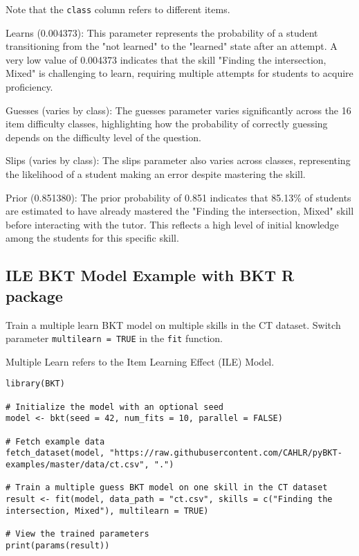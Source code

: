 \documentclass{article}
\begin{document}
Note that the \texttt{class} column refers to different items.

Learns (0.004373): This parameter represents the probability of a student transitioning from the "not learned" to the "learned" state after an attempt. A very low value of 0.004373 indicates that the skill "Finding the intersection, Mixed" is challenging to learn, requiring multiple attempts for students to acquire proficiency.

Guesses (varies by class): The guesses parameter varies significantly across the 16 item difficulty classes, highlighting how the probability of correctly guessing depends on the difficulty level of the question.

Slips (varies by class): The slips parameter also varies across classes, representing the likelihood of a student making an error despite mastering the skill.

Prior (0.851380): The prior probability of 0.851 indicates that 85.13\% of students are estimated to have already mastered the "Finding the intersection, Mixed" skill before interacting with the tutor. This reflects a high level of initial knowledge among the students for this specific skill.

\subsection{ILE BKT Model Example with BKT R package}

Train a multiple learn BKT model on multiple skills in the CT dataset. Switch parameter \texttt{multilearn = TRUE} in the \texttt{fit} function.

Multiple Learn refers to the Item Learning Effect (ILE) Model.

\begin{lstlisting}[caption={R code to train an ILE BKT model}]
library(BKT)

# Initialize the model with an optional seed
model <- bkt(seed = 42, num_fits = 10, parallel = FALSE)

# Fetch example data
fetch_dataset(model, "https://raw.githubusercontent.com/CAHLR/pyBKT-examples/master/data/ct.csv", ".")

# Train a multiple guess BKT model on one skill in the CT dataset
result <- fit(model, data_path = "ct.csv", skills = c("Finding the intersection, Mixed"), multilearn = TRUE)

# View the trained parameters
print(params(result))
\end{lstlisting}
\end{document}
